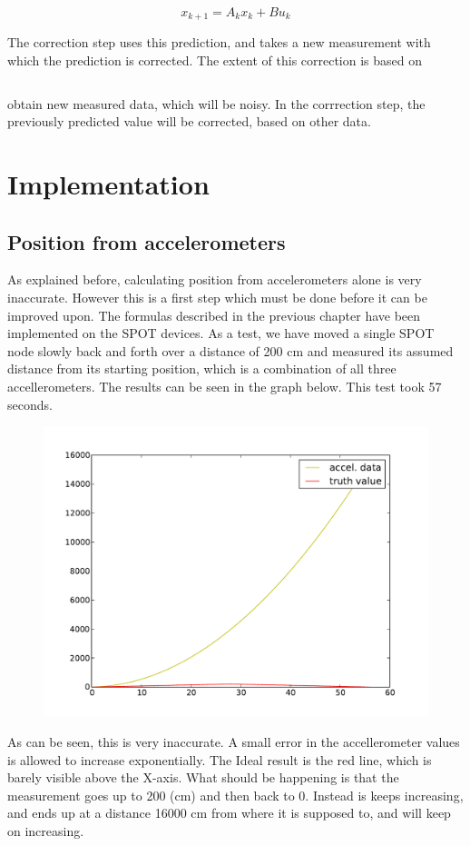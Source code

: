 \documentclass[twoside, 11pt]{uva-bachelor-thesis}
\begin{document}
$$x_{k+1} = A_kx_k + Bu_k$$

The correction step uses this prediction, and takes a new measurement with which the prediction is corrected. The extent of this correction is based on 

$$$$


obtain new measured data, which will be noisy. In the corrrection step, the previously predicted value will be corrected, based on other data.
\chapter{Implementation}
  \section{Position from accelerometers}
  As explained before, calculating position from accelerometers alone is very inaccurate. However this is a first step which must be done before it can be improved upon. The formulas described in the previous chapter have been implemented on the SPOT devices. As a test, we have moved a single SPOT node slowly back and forth over a distance of 200 cm and measured its assumed distance from its starting position, which is a combination of all three accellerometers. The results can be seen in the graph below. This test took 57 seconds.

  \begin{figure}[H]
  \centering
  \includegraphics[width=\textwidth]{onlyaccel.pdf}
  \end{figure}
  As can be seen, this is very inaccurate. A small error in the accellerometer values is allowed to increase exponentially. The Ideal result is the red line, which is barely visible above the X-axis. What should be happening is that the measurement goes up to 200 (cm) and then back to 0. Instead is keeps increasing, and ends up at a distance 16000 cm from where it is supposed to, and will keep on increasing. 
  
\end{document}
